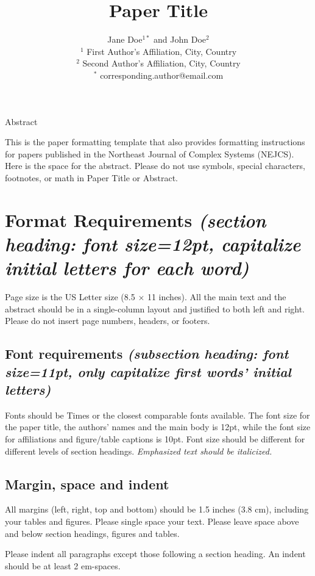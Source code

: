 \documentclass[12pt]{article}
\title{\bf \large Paper Title}
\author{\normalsize Jane Doe$^{1*}$ and John Doe$^2$\\
\small$^1$ First Author's Affiliation, City, Country\\
\small$^2$ Second Author's Affiliation, City, Country\\
\small$^*$ corresponding.author@email.com}
\date{}
\begin{document}
\maketitle

\thispagestyle{empty}

\begin{center}Abstract\end{center}
This is the paper formatting template that also provides formatting instructions for papers published in the Northeast Journal of Complex Systems (NEJCS). Here is the space for the abstract. Please do not use symbols, special characters, footnotes, or math in Paper Title or Abstract. 

\section{Format Requirements {\it (section heading: font size=12pt, capitalize initial letters for each word)}}

Page size is the US Letter size (8.5 $\times$ 11 inches). All the main text and the abstract should be in a single-column layout and justified to both left and right. Please do not insert page numbers, headers, or footers.

\subsection{Font requirements {\it (subsection heading: font size=11pt, only capitalize first words’ initial letters)}}

Fonts should be Times or the closest comparable fonts available. The font size for the paper title, the authors’ names and the main body is 12pt, while the font size for affiliations and figure/table captions is 10pt. Font size should be different for different levels of section headings. {\it Emphasized text should be italicized.}

\subsection{Margin, space and indent}

All margins (left, right, top and bottom) should be 1.5 inches (3.8 cm), including your tables and figures. Please single space your text. Please leave space above and below section headings, figures and tables.

Please indent all paragraphs except those following a section heading. An indent should be at least 2 em-spaces.
\end{document}
